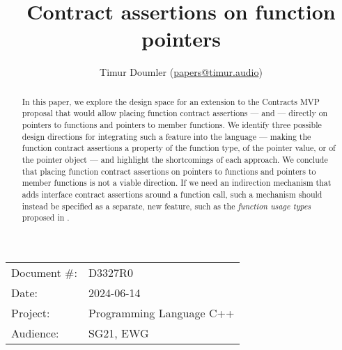 

 \usepackage[bottom]{footmisc} 

 \usepackage{longtable}


\usepackage{tikz,lipsum,lmodern}
\usepackage[most]{tcolorbox}



\usepackage{titlesec}
\usepackage{tocloft}


\newcommand{\changelocaltocdepth}[1]{%
  \addtocontents{toc}{\protect\setcounter{tocdepth}{#1}}%
  \setcounter{tocdepth}{#1}%
}

\setcounter{tocdepth}{3}



\title{Contract assertions on function pointers}
\author{ Timur Doumler \small(\href{mailto:papers@timur.audio}{papers@timur.audio}) 
}
\date{}
\maketitle

\begin{tabular}{ll}
Document \#: & D3327R0 \\
Date: &2024-06-14 \\
Project: & Programming Language C++ \\
Audience: & SG21, EWG
\end{tabular}

\begin{abstract}
In this paper, we explore the design space for an extension to the Contracts MVP proposal \cite{P2900R7} that would allow placing function contract assertions ---  and  --- directly on pointers to functions and pointers to member functions. We identify three possible design directions for integrating such a feature into the language --- making the function contract assertions a property of the function type, of the pointer value, or of the pointer object --- and highlight the shortcomings of each approach. We conclude that placing function contract assertions on pointers to functions and pointers to member functions is not a viable direction. If we need an indirection mechanism that adds interface contract assertions around a function call, such a mechanism should instead be specified as a separate, new feature, such as the \emph{function usage types} proposed in \cite{P3271R0}.
\end{abstract}

